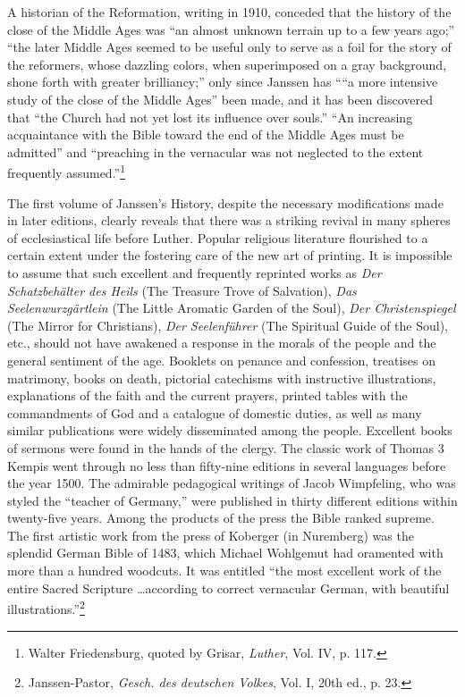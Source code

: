 A historian of the Reformation, writing in 1910, conceded that the
history of the close of the Middle Ages was “an almost unknown terrain
up to a few years ago;” “the later Middle Ages seemed to be useful only
to serve as a foil for the story of the reformers, whose dazzling colors,
when superimposed on a gray background, shone forth with greater brilliancy;”
only since Janssen has ““a more intensive study of the close of the
Middle Ages” been made, and it has been discovered that “the Church had
not yet lost its influence over souls.” “An increasing acquaintance with the
Bible toward the end of the Middle Ages must be admitted” and “preaching
in the vernacular was not neglected to the extent frequently assumed.”\footnote
{Walter Friedensburg, quoted by Grisar, \textit{Luther}, Vol. IV, p. 117.}

The first volume of Janssen’s History, despite the necessary modifications
made in later editions, clearly reveals that there was a
striking revival in many spheres of ecclesiastical life before Luther.
Popular religious literature flourished to a certain extent under the
fostering care of the new art of printing. It is impossible to assume
that such excellent and frequently reprinted works as \textit{Der Schatzbehälter
des Heils} (The Treasure Trove of Salvation), \textit{Das
Seelenwurzgärtlein} (The Little Aromatic Garden of the Soul), \textit{Der
Christenspiegel} (The Mirror for Christians), \textit{Der Seelenführer} (The
Spiritual Guide of the Soul), etc., should not have awakened a response
in the morals of the people and the general sentiment of the
age. Booklets on penance and confession, treatises on matrimony,
books on death, pictorial catechisms with instructive illustrations,
explanations of the faith and the current prayers, printed tables
with the commandments of God and a catalogue of domestic duties,
as well as many similar publications were widely disseminated among
the people. Excellent books of sermons were found in the hands of
the clergy. The classic work of Thomas 3 Kempis went through no
less than fifty-nine editions in several languages before the year
1500. The admirable pedagogical writings of Jacob Wimpfeling,
who was styled the “teacher of Germany,” were published in thirty
different editions within twenty-five years. Among the products of
the press the Bible ranked supreme. The first artistic work from the
press of Koberger (in Nuremberg) was the splendid German Bible
of 1483, which Michael Wohlgemut had oramented with more than
a hundred woodcuts. It was entitled “the most excellent work of
the entire Sacred Scripture \dots according to correct vernacular German,
with beautiful illustrations.”\footnote
{Janssen-Pastor, \textit{Gesch. des deutschen Volkes}, Vol. I, 20th ed., p. 23.}

